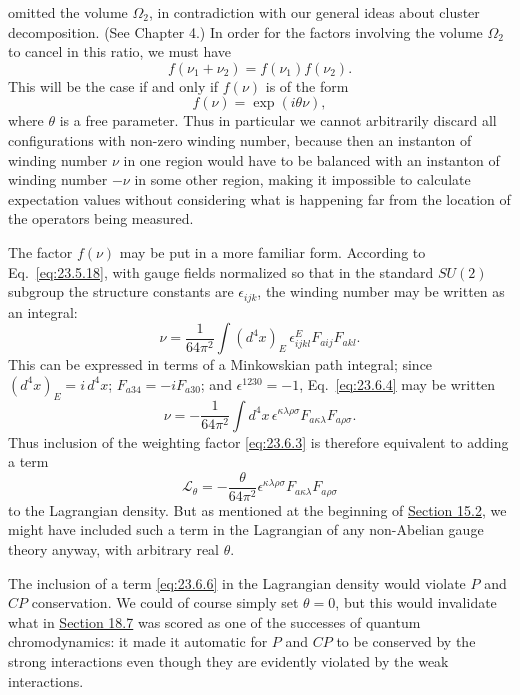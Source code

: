 omitted the volume $\Omega_2$, in contradiction with our general ideas
about cluster decomposition. (See Chapter 4.) In order for the factors
involving the volume $\Omega_2$ to cancel in this ratio, we must have
\[
f(\nu_1+\nu_2)=f(\nu_1)f(\nu_2).
\]
This will be the case if and only if $f(\nu)$ is of the form
\begin{equation}
f(\nu)=\exp(i\theta\nu),
\tag{23.6.3}\label{eq:23.6.3}
\end{equation}
where $\theta$ is a free parameter. Thus in particular we cannot
arbitrarily discard all configurations with non-zero winding number,
because then an instanton of winding number $\nu$ in one region would
have to be balanced with an instanton of winding number $-\nu$ in some
other region, making it impossible to calculate expectation values
without considering what is happening far from the location of the
operators being measured.

The factor $f(\nu)$ may be put in a more familiar form. According to
Eq.~\eqref{eq:23.5.18}, with gauge fields normalized so that in the
standard $SU(2)$ subgroup the structure constants are
$\epsilon_{ijk}$, the winding number may be written as an integral:
\begin{equation}
\nu=\frac{1}{64\pi^2}\int(d^4x)_E\,
\epsilon^E_{ijkl}F_{a ij}F_{a kl}.
\tag{23.6.4}\label{eq:23.6.4}
\end{equation}
This can be expressed in terms of a Minkowskian path integral; since
$(d^4x)_E=i\,d^4x$; $F_{a34}=-iF_{a30}$; and
$\epsilon^{1230}=-1$, Eq.~\eqref{eq:23.6.4} may be written
\begin{equation}
\nu=-\frac{1}{64\pi^2}\int d^4x\,
\epsilon^{\kappa\lambda\rho\sigma}
F_{a\kappa\lambda}F_{a\rho\sigma}.
\tag{23.6.5}\label{eq:23.6.5}
\end{equation}
Thus inclusion of the weighting factor \eqref{eq:23.6.3} is therefore
equivalent to adding a term
\begin{equation}
\mathcal L_\theta=-\frac{\theta}{64\pi^2}
\epsilon^{\kappa\lambda\rho\sigma}
F_{a\kappa\lambda}F_{a\rho\sigma}
\tag{23.6.6}\label{eq:23.6.6}
\end{equation}
to the Lagrangian density. But as mentioned at the beginning of
\hyperref[sec:15.2]{Section 15.2}, we might have included such a term in
the Lagrangian of any non-Abelian gauge theory anyway, with arbitrary
real $\theta$.

The inclusion of a term \eqref{eq:23.6.6} in the Lagrangian density would
violate $P$ and $CP$ conservation. We could of course simply set
$\theta=0$, but this would invalidate what in
\hyperref[sec:18.7]{Section 18.7} was scored as one of the successes of
quantum chromodynamics: it made it automatic for $P$ and $CP$ to be
conserved by the strong interactions even though they are evidently
violated by the weak interactions.

